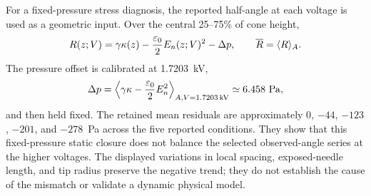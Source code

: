For a fixed-pressure stress diagnosis, the reported half-angle at each voltage is used as a geometric input. Over the central 25--75\% of cone height,
\[
R(z;V)=\gamma\kappa(z)-\frac{\varepsilon_0}{2}E_n(z;V)^2-\Delta p,
\qquad \overline R=\langle R\rangle_A.
\]
The pressure offset is calibrated at 1.7203~kV,
\[
\Delta p=\left\langle\gamma\kappa-\frac{\varepsilon_0}{2}E_n^2\right\rangle_{A,V=1.7203\,\mathrm{kV}}
\simeq6.458~\mathrm{Pa},
\]
and then held fixed. The retained mean residuals are approximately 0, $-44$, $-123$, $-201$, and $-278$~Pa across the five reported conditions. They show that this fixed-pressure static closure does not balance the selected observed-angle series at the higher voltages. The displayed variations in local spacing, exposed-needle length, and tip radius preserve the negative trend; they do not establish the cause of the mismatch or validate a dynamic physical model.
